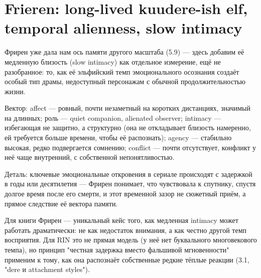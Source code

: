 \section{Frieren: long-lived kuudere-ish elf, temporal alienness, slow intimacy}

Фрирен уже дала нам ось памяти другого масштаба (5.9) — здесь добавим её медленную близость (slow intimacy) как отдельное измерение, ещё не разобранное: то, как её эльфийский темп эмоционального осознания создаёт особый тип драмы, недоступный персонажам с обычной продолжительностью жизни.

Вектор: affect — ровный, почти незаметный на коротких дистанциях, значимый на длинных; роль — quiet companion, alienated observer; intimacy — избегающая не защитно, а структурно (она не откладывает близость намеренно, ей требуется больше времени, чтобы её распознать); agency — стабильно высокая, редко подвергается сомнению; conflict — почти отсутствует, конфликт у неё чаще внутренний, с собственной непонятливостью.

Деталь: ключевые эмоциональные откровения в сериале происходят с задержкой в годы или десятилетия — Фрирен понимает, что чувствовала к спутнику, спустя долгое время после его смерти, и этот временной зазор не сюжетный приём, а прямое следствие её вектора памяти.

Для книги Фрирен — уникальный кейс того, как медленная intimacy может работать драматически: не как недостаток внимания, а как честно другой темп восприятия. Для RIN это не прямая модель (у неё нет буквального многовекового темпа), но принцип "честная задержка вместо фальшивой мгновенности" применим к тому, как она распознаёт собственные редкие тёплые реакции (3.1, "dere и attachment styles").
